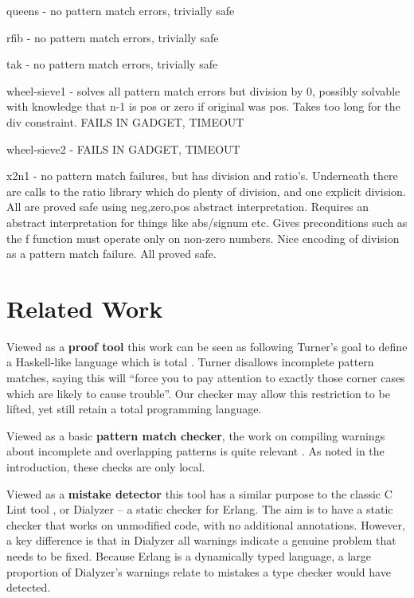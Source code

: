 \documentclass[preprint]{sigplanconf}
\begin{document}
queens - no pattern match errors, trivially safe

rfib - no pattern match errors, trivially safe

tak - no pattern match errors, trivially safe

wheel-sieve1 - solves all pattern match errors but division by 0, possibly solvable with knowledge that n-1 is pos or zero if original was pos. Takes too long for the div constraint. FAILS IN GADGET, TIMEOUT

wheel-sieve2 - FAILS IN GADGET, TIMEOUT

x2n1 - no pattern match failures, but has division and ratio's. Underneath there are calls to the ratio library which do plenty of division, and one explicit division. All are proved safe using neg,zero,pos abstract interpretation. Requires an abstract interpretation for things like abs/signum etc. Gives preconditions such as the f function must operate only on non-zero numbers. Nice encoding of division as a pattern match failure. All proved safe.

\section{Related Work}
\label{sec:related}

Viewed as a \textbf{proof tool} this work can be seen as following Turner's goal to define a Haskell-like language which is total \cite{tfp:total}. Turner disallows incomplete pattern matches, saying this will ``force you to pay attention to exactly those corner cases which are likely to cause trouble''. Our checker may allow this restriction to be lifted, yet still retain a total programming language.

Viewed as a basic \textbf{pattern match checker}, the work on compiling warnings about incomplete and overlapping patterns is quite relevant \cite{ghc,pattern_match}. As noted in the introduction, these checks are only local.

Viewed as a \textbf{mistake detector} this tool has a similar purpose to the classic C Lint tool \cite{lint}, or Dialyzer \cite{dialyzer} -- a static checker for Erlang. The aim is to have a static checker that works on unmodified code, with no additional annotations. However, a key difference is that in Dialyzer all warnings indicate a genuine problem that needs to be fixed. Because Erlang is a dynamically typed language, a large proportion of Dialyzer's warnings relate to mistakes a type checker would have detected.
\end{document}
